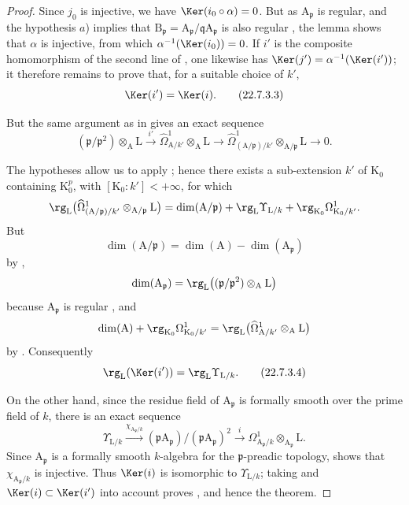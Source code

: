 \begin{proof}
Since $j_0$ is injective, we have $\Ker(i_0\circ\alpha)=0$.
But as $\mathrm{A}_\mathfrak{p}$ is regular, and the hypothesis $a$) implies that $\mathrm{B}_\mathfrak{p}=\mathrm{A}_\mathfrak{p}/\mathfrak{q}\mathrm{A}_\mathfrak{p}$ is also regular , the lemma  shows that $\alpha$ is injective, from which $\alpha^{-1}(\Ker(i_0))=0$.
If $i'$ is the composite homomorphism of the second line of
, one likewise has
$\Ker(j')=\alpha^{-1}(\Ker(i'))$; it therefore remains to prove that, for a
suitable choice of $k'$,
\begin{equation}
\label{0.22.7.3.3}
  \Ker(i')=\Ker(i).
  \tag{22.7.3.3}
\end{equation}

But the same argument as in  gives an exact sequence
\[
  (\mathfrak{p}/\mathfrak{p}^2)\otimes_\mathrm{A}\mathrm{L}
  \xrightarrow{i'}\widehat{\Omega}^1_{\mathrm{A}/k'}
  \otimes_\mathrm{A}\mathrm{L}\longrightarrow
  \widehat{\Omega}^1_{(\mathrm{A}/\mathfrak{p})/k'}
  \otimes_{\mathrm{A}/\mathfrak{p}}\mathrm{L}\longrightarrow 0.
\]

The hypotheses allow us to apply ; hence there exists a
sub-extension $k'$ of $\mathrm{K}_0$ containing $\mathrm{K}_0^p$, with
$[\mathrm{K}_0:k']<+\infty$, for which
\[
  \rg_\mathrm{L}\bigl(
  \widehat{\Omega}^1_{(\mathrm{A}/\mathfrak{p})/k'}
  \otimes_{\mathrm{A}/\mathfrak{p}}\mathrm{L}\bigr)
  =\dim(\mathrm{A}/\mathfrak{p})
  +\rg_\mathrm{L}\Upsilon_{\mathrm{L}/k}
  +\rg_{\mathrm{K}_0}\Omega^1_{\mathrm{K}_0/k'}.
\]
But
\[
  \dim(\mathrm{A}/\mathfrak{p})
  =\dim(\mathrm{A})-\dim(\mathrm{A}_\mathfrak{p})
\]
by ,
\[
  \dim(\mathrm{A}_\mathfrak{p})
  =\rg_\mathrm{L}\bigl((\mathfrak{p}/\mathfrak{p}^2)
  \otimes_\mathrm{A}\mathrm{L}\bigr)
\]
because $\mathrm{A}_\mathfrak{p}$ is regular , and
\[
  \dim(\mathrm{A})+\rg_{\mathrm{K}_0}\Omega^1_{\mathrm{K}_0/k'}
  =\rg_\mathrm{L}\bigl(
  \widehat{\Omega}^1_{\mathrm{A}/k'}\otimes_\mathrm{A}\mathrm{L}\bigr)
\]
by . Consequently
\begin{equation}
\label{0.22.7.3.4}
  \rg_\mathrm{L}(\Ker(i'))=\rg_\mathrm{L}\Upsilon_{\mathrm{L}/k}.
  \tag{22.7.3.4}
\end{equation}

On the other hand, since the residue field of $\mathrm{A}_\mathfrak{p}$ is
formally smooth over the prime field of $k$, there is an exact sequence
\[
  \Upsilon_{\mathrm{L}/k}
  \xrightarrow{\chi_{\mathrm{A}_\mathfrak{p}/k}}
  (\mathfrak{p}\mathrm{A}_\mathfrak{p})/
  (\mathfrak{p}\mathrm{A}_\mathfrak{p})^2
  \xrightarrow{i}\Omega^1_{\mathrm{A}_\mathfrak{p}/k}
  \otimes_{\mathrm{A}_\mathfrak{p}}\mathrm{L}.
\]
Since $\mathrm{A}_\mathfrak{p}$ is a formally smooth $k$-algebra for the
$\mathfrak{p}$-preadic topology,  shows that
$\chi_{\mathrm{A}_\mathfrak{p}/k}$ is injective. Thus $\Ker(i)$ is isomorphic
to $\Upsilon_{\mathrm{L}/k}$; taking  and
$\Ker(i)\subset\Ker(i')$ into account proves , and hence the
theorem.
\end{proof}

